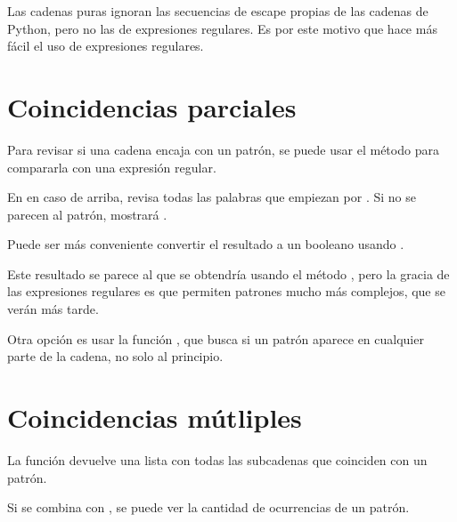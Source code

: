 
Las cadenas puras ignoran las secuencias de escape propias de las cadenas de Python, pero no las de expresiones regulares.
Es por este motivo que hace más fácil el uso de expresiones regulares.

\section{Coincidencias parciales}

Para revisar si una cadena encaja con un patrón, se puede usar el método  para compararla con una expresión regular.


En en caso de arriba, revisa todas las palabras que empiezan por .
Si no se parecen al patrón, mostrará .

Puede ser más conveniente convertir el resultado  a un booleano usando .


Este resultado se parece al que se obtendría usando el método , pero la gracia de las expresiones regulares es que permiten patrones mucho más complejos, que se verán más tarde.

Otra opción es usar la función , que busca si un patrón aparece en cualquier parte de la cadena, no solo al principio.


\section{Coincidencias mútliples}

La función  devuelve una lista con todas las subcadenas que coinciden con un patrón.


Si se combina  con , se puede ver la cantidad de ocurrencias de un patrón.



